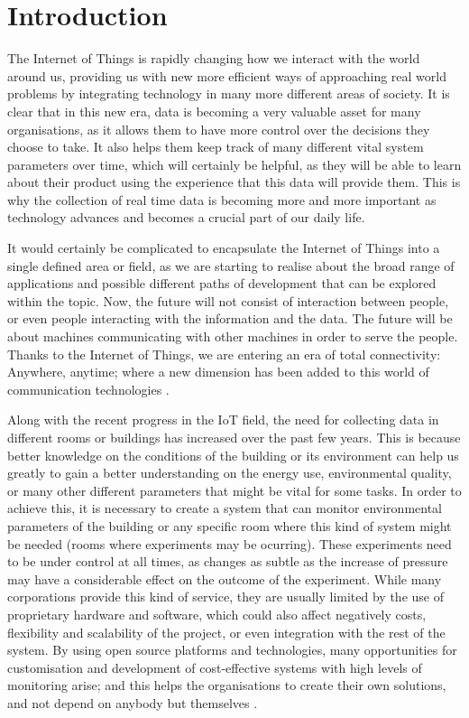\documentclass[12pt]{article}
\begin{document}
\tableofcontents
\newpage

\section{Introduction}

The Internet of Things is rapidly changing how we interact with the world around us, providing us with new more efficient ways of approaching real world problems by integrating technology in many more different areas of society. It is clear that in this new era, data is becoming a very valuable asset for many organisations, as it allows them to have more control over the decisions they choose to take. It also helps them keep track of many different vital system parameters over time, which will certainly be helpful, as they will be able to learn about their product using the experience that this data will provide them. This is why the collection of real time data is becoming more and more important as technology advances and becomes a crucial part of our daily life. \par 

It would certainly be complicated to encapsulate the Internet of Things into a single defined area or field, as we are starting to realise about the broad range of applications and possible different paths of development that can be explored within the topic. Now, the future will not consist of interaction between people, or even people interacting with the information and the data. The future will be about machines communicating with other machines in order to serve the people. Thanks to the Internet of Things, we are entering an era of total connectivity: Anywhere, anytime; where a new dimension has been added to this world of communication technologies \cite{future-internet}.\par

Along with the recent progress in the IoT field, the need for collecting data in different rooms or buildings has increased over the past few years. This is because better knowledge on the conditions of the building or its environment can help us greatly to gain a better understanding on the energy use, environmental quality, or many other different parameters that might be vital for some tasks. In order to achieve this, it is necessary to create a system that can monitor environmental parameters of the building or any specific room where this kind of system might be needed (rooms where experiments may be ocurring). These experiments need to be under control at all times, as changes as subtle as the increase of pressure may have a considerable effect on the outcome of the experiment. While many corporations provide this kind of service, they are usually limited by the use of proprietary hardware and software, which could also affect negatively costs, flexibility and scalability of the project, or even integration with the rest of the system. By using open source platforms and technologies, many opportunities for customisation and development of cost-effective systems with high levels of monitoring arise; and this helps the organisations to create their own solutions, and not depend on anybody but themselves \cite{building-science}.\par 
\end{document}
